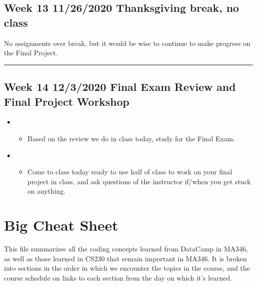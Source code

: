 \documentclass[letterpaper,10pt,english]{sphinxmanual}
\begin{document}
\section{Week 13 \sphinxhyphen{} 11/26/2020 \sphinxhyphen{} Thanksgiving break, no class}
\label{\detokenize{course-schedule:week-13-11-26-2020-thanksgiving-break-no-class}}
No assignments over break, but it would be wise to continue to make progress on the Final Project.


\bigskip\hrule\bigskip



\section{Week 14 \sphinxhyphen{} 12/3/2020 \sphinxhyphen{} Final Exam Review and Final Project Workshop}
\label{\detokenize{course-schedule:week-14-12-3-2020-final-exam-review-and-final-project-workshop}}\begin{itemize}
\item {} 
\begin{itemize}
\item {} 
Based on the review we do in class today, study for the Final Exam.

\end{itemize}

\item {} 
\begin{itemize}
\item {} 
Come to class today ready to use half of class to work on your final project in class, and ask questions of the instructor if/when you get stuck on anything.

\end{itemize}

\end{itemize}


\chapter{Big Cheat Sheet}
\label{\detokenize{big-cheat-sheet:big-cheat-sheet}}\label{\detokenize{big-cheat-sheet::doc}}
This file summarizes all the coding concepts learned from DataCamp in MA346, as well as those learned in CS230 that remain important in MA346.  It is broken into sections in the order in which we encounter the topics in the course, and the course schedule on {\hyperref[\detokenize{intro::doc}]{}} links to each section from the day on which it’s learned.
\end{document}
